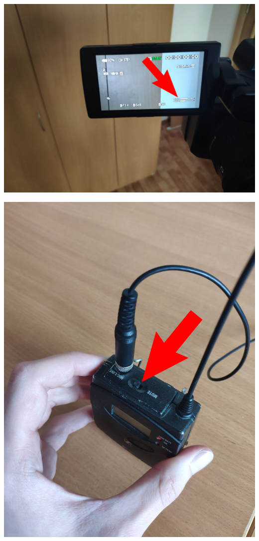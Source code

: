 \begin{enumerate}
\begin{enumerate}
                \begin{minipage}[c]{0.45\textwidth}
                  \includegraphics[width=\textwidth]{Images/PortableCamera/micro/step10.6-1-sound-view.jpg}
                \end{minipage}
                \hfill
                \begin{minipage}[c]{0.38\textwidth}
                  \includegraphics[width=\textwidth]{Images/PortableCamera/micro/step10.6-2-mute.jpg}
                \end{minipage}


\end{enumerate}
\end{enumerate}
